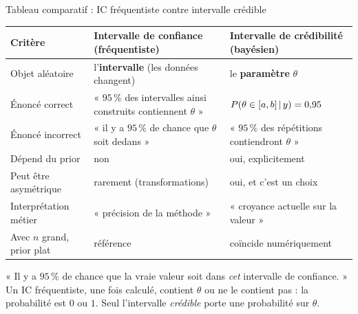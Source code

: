\begin{frame}{Tableau comparatif : IC fréquentiste contre intervalle crédible}
\small
\vspace{-2mm}
\begin{center}
{\footnotesize
\begin{tabular}{@{}p{}p{}p{}@{}}
\toprule
\textbf{Critère} & \textbf{Intervalle de confiance (fréquentiste)} & \textbf{Intervalle de crédibilité (bayésien)} \\
\midrule
Objet aléatoire & l'\textbf{intervalle} (les données changent) & le \textbf{paramètre} $\theta$ \\
\addlinespace
Énoncé correct & « $95\,\%$ des intervalles ainsi construits contiennent $\theta$ » &
$P(\theta \in [a,b] \,\vert\, y) = 0{,}95$ \\
\addlinespace
Énoncé incorrect & « \nok{} il y a $95\,\%$ de chance que $\theta$ soit dedans » &
« \nok{} $95\,\%$ des répétitions contiendront $\theta$ » \\
\addlinespace
Dépend du prior & non & \warn{} oui, explicitement \\
\addlinespace
Peut être asymétrique & rarement (transformations) & oui, et c'est un choix \\
\addlinespace
Interprétation métier & « précision de la méthode » &
« croyance actuelle sur la valeur » \\
\addlinespace
Avec $n$ grand, prior plat & référence & \ok{} coïncide numériquement \\
\bottomrule
\end{tabular}}
\end{center}
\vspace{1mm}
\begin{wbox}
\nok{} « Il y a $95\,\%$ de chance que la vraie valeur soit dans \emph{cet}
intervalle de confiance. » Un IC fréquentiste, une fois calculé, contient $\theta$
ou ne le contient pas : la probabilité est $0$ ou $1$. Seul l'intervalle
\emph{crédible} porte une probabilité sur $\theta$.
\end{wbox}
\end{frame}

